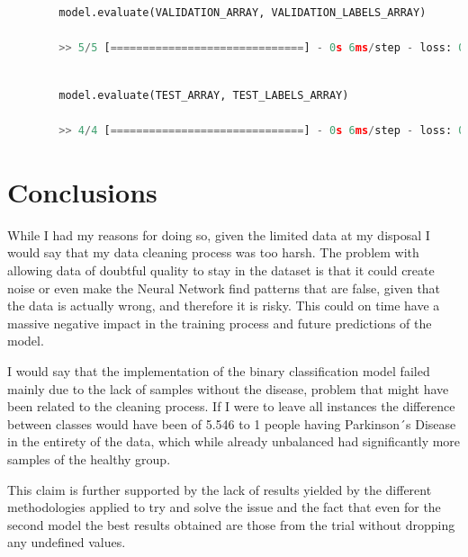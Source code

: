 \documentclass[12pt, a4paper]{article}
\begin{document}
	\vspace{7mm}
	
	\begin{lstlisting}[language=Python]
		
		model.evaluate(VALIDATION_ARRAY, VALIDATION_LABELS_ARRAY)
		
		>> 5/5 [==============================] - 0s 6ms/step - loss: 0.8420 - categorical_accuracy: 0.6783 - accuracy: 0.0000e+00
	\end{lstlisting}
	
	\vspace{7mm}
	
	\begin{lstlisting}[language=Python]
		
		model.evaluate(TEST_ARRAY, TEST_LABELS_ARRAY)
		
		>> 4/4 [==============================] - 0s 6ms/step - loss: 0.8810 - categorical_accuracy: 0.6579 - accuracy: 0.0000e+00
	\end{lstlisting}
	
	\vspace{5mm}
	
	\clearpage
	
	\section{Conclusions}
	
	While I had my reasons for doing so, given the limited data at my disposal I would say that my data cleaning process was too harsh. The problem with allowing data of doubtful quality to stay in the dataset is that it could create noise or even make the Neural Network find patterns that are false, given that the data is actually wrong, and therefore it is risky. This could on time have a massive negative impact in the training process and future predictions of the model.
	
	I would say that the implementation of the binary classification model failed mainly due to the lack of samples without the disease, problem that might have been related to the cleaning process. If I were to leave all instances the difference between classes would have been of 5.546 to 1 people having Parkinson´s Disease in the entirety of the data, which while already unbalanced had significantly more samples of the healthy group.
	
	This claim is further supported by the lack of results yielded by the different methodologies applied to try and solve the issue and the fact that even for the second model the best results obtained are those from the trial without dropping any undefined values.
	
\end{document}
